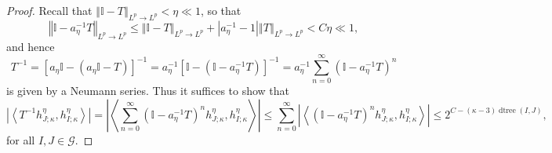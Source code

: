 \documentclass[10pt,a4paper]{amsart}
\begin{document}
\begin{proof}
Recall that $\left\Vert \mathbb{I}-T\right\Vert _{L^{p}\rightarrow L^{p}}%
<\eta\ll1$, so that
\[
\left\Vert \mathbb{I}-a_{\eta}^{-1}T\right\Vert _{L^{p}\rightarrow L^{p}}%
\leq\left\Vert \mathbb{I}-T\right\Vert _{L^{p}\rightarrow L^{p}}+\left\vert
a_{\eta}^{-1}-1\right\vert \left\Vert T\right\Vert _{L^{p}\rightarrow L^{p}%
}<C\eta\ll1,
\]
and hence
\[
T^{-1}=\left[  a_{\eta}\mathbb{I}-\left(  a_{\eta}\mathbb{I}-T\right)
\right]  ^{-1}=a_{\eta}^{-1}\left[  \mathbb{I}-\left(  \mathbb{I}-a_{\eta
}^{-1}T\right)  \right]  ^{-1}=a_{\eta}^{-1}\sum_{n=0}^{\infty}\left(
\mathbb{I}-a_{\eta}^{-1}T\right)  ^{n}%
\]
is given by a Neumann series. Thus it suffices to show that
\begin{equation}
\left\vert \left\langle T^{-1}h_{J;\kappa}^{\eta},h_{I;\kappa}^{\eta
}\right\rangle \right\vert =\left\vert \left\langle \sum_{n=0}^{\infty}\left(
\mathbb{I}-a_{\eta}^{-1}T\right)  ^{n}h_{J;\kappa}^{\eta},h_{I;\kappa}^{\eta
}\right\rangle \right\vert \leq\sum_{n=0}^{\infty}\left\vert \left\langle
\left(  \mathbb{I}-a_{\eta}^{-1}T\right)  ^{n}h_{J;\kappa}^{\eta},h_{I;\kappa
}^{\eta}\right\rangle \right\vert \leq2^{C-\left(  \kappa-3\right)
\operatorname*{dtree}\left(  I,J\right)  },\label{suff}%
\end{equation}
for all $I,J\in\mathcal{G}$.


\end{proof}
\end{document}
